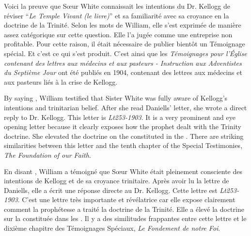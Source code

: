 Voici la preuve que Sœur White connaissait les intentions du Dr. Kellogg de réviser “\textit{Le Temple Vivant (le livre)}” et sa familiarité avec sa croyance en la doctrine de la Trinité. Selon les mots de William, elle s'est exprimée de manière assez catégorique sur cette question. Elle l'a jugée comme une entreprise non profitable. Pour cette raison, il était nécessaire de publier bientôt un Témoignage spécial. Et c'est ce qui s'est produit. C'est ainsi que les \textit{Témoignages pour l'Église contenant des lettres aux médecins et aux pasteurs - Instruction aux Adventistes du Septième Jour} ont été publiés en 1904, contenant des lettres aux médecins et aux pasteurs liés à la crise de Kellogg.


By saying , William testified that Sister White was fully aware of Kellogg's intentions and trinitarian belief. After she read Daniells’ letter, she wrote a direct reply to Dr. Kellogg. This letter is \textit{Lt253-1903}. It is a very prominent and eye opening letter because it clearly exposes how the prophet dealt with the Trinity doctrine. She elevated the doctrine on the  constituted in the . There are striking similarities between this letter and the tenth chapter of the Special Testimonies, \textit{The Foundation of our Faith}.


En disant , William a témoigné que Sœur White était pleinement consciente des intentions de Kellogg et de sa croyance trinitaire. Après avoir lu la lettre de Daniells, elle a écrit une réponse directe au Dr. Kellogg. Cette lettre est \textit{Lt253-1903}. C'est une lettre très importante et révélatrice car elle expose clairement comment la prophétesse a traité la doctrine de la Trinité. Elle a élevé la doctrine sur la  constituée dans les . Il y a des similitudes frappantes entre cette lettre et le dixième chapitre des Témoignages Spéciaux, \textit{Le Fondement de notre Foi}.


